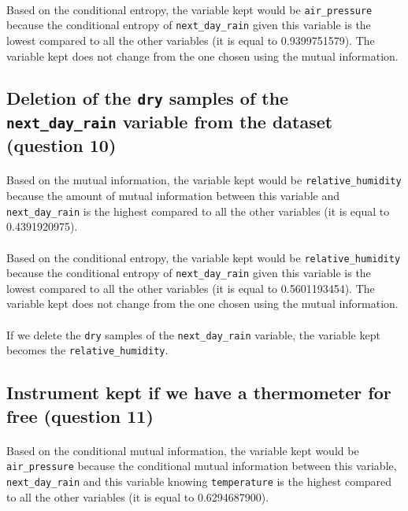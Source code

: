 \documentclass[a4paper, 11pt, oneside]{article}
\begin{document}
\paragraph{}Based on the conditional entropy, the variable kept would be \texttt{air\_pressure} because the conditional entropy of \texttt{next\_day\_rain} given this variable is the lowest compared to all the other variables (it is equal to 0.9399751579). The variable kept does not change from the one chosen using the mutual information.

\subsection{Deletion of the \texttt{dry} samples of the \texttt{next\_day\_rain} variable from the dataset (question 10)}

\paragraph{}Based on the mutual information, the variable kept would be \texttt{relative\_humidity} because the amount of mutual information between this variable and \texttt{next\_day\_rain} is the highest compared to all the other variables (it is equal to 0.4391920975).

\paragraph{}Based on the conditional entropy, the variable kept would be \texttt{relative\_humidity} because the conditional entropy of \texttt{next\_day\_rain} given this variable is the lowest compared to all the other variables (it is equal to 0.5601193454). The variable kept does not change from the one chosen using the mutual information.

\paragraph{}If we delete the \texttt{dry} samples of the \texttt{next\_day\_rain} variable, the variable kept becomes the \texttt{relative\_humidity}.

\subsection{Instrument kept if we have a thermometer for free (question 11)}

\paragraph{}Based on the conditional mutual information, the variable kept would be \texttt{air\_pressure} because the conditional mutual information between this variable, \texttt{next\_day\_rain} and this variable knowing \texttt{temperature} is the highest compared to all the other variables (it is equal to 0.6294687900). 
\end{document}
